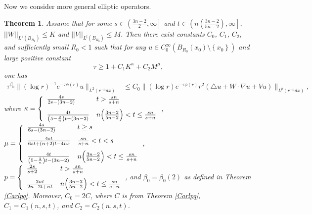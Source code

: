 \documentclass[11pt]{amsart}
\theoremstyle{plain}
\newtheorem{theorem}{Theorem}
\numberwithin{equation}{section}
\begin{document}
Now we consider more general elliptic operators.

\begin{theorem}
Assume that for some $s \in {\left( {\frac{3n-2}{2}, {\infty}} \right] }$ and $t \in {\left( { n{\left( {\frac{3n-2}{5n-2}} \right) }, {\infty}} \right] }$, ${\left\vert\left\vert {W}\right\vert\right\vert}_{L^s{\left( {B_{R_0}} \right) }} \le K$ and ${\left\vert\left\vert {V}\right\vert\right\vert}_{L^t{\left( {B_{R_0}} \right) }} \le M$.
Then there exist constants $C_0$, $C_1$, $C_2$, and sufficiently small $R_0 < 1$  such that for any $u\in C^{\infty}_{0}(B_{R_0}(x_0)\setminus {\left\{{x_0}\right\}})$ and large positive constant
$$\tau \ge 1+ C_1 K^{\kappa} + C_2 M^{\mu},$$
one has
\begin{align}
\tau^{{\beta}_0} \|(\log r)^{-1} e^{-\tau \phi(r)}u\|_{L^2(r^{-n}dx)}
&\leq  C_0 \|(\log r ) e^{-\tau \phi(r)} r^2{\left( { \triangle u + W \cdot {\nabla} u + V u} \right) }\|_{L^p(r^{-n} dx)} ,
\label{main1}
\end{align}
where
${\displaystyle} \kappa = \left\{\begin{array}{ll}
\frac{4s}{2s - {\left( {3n-2} \right) }} & t > \frac{sn}{s+n} \medskip \\
\frac{4t}{{\left( {5 - \frac 2 n} \right) }t - {\left( {3n-2} \right) }} & n{\left( {\frac{3n-2}{5n-2}} \right) }
< t \le \frac{sn}{s+n}
\end{array}\right.$,
${\displaystyle} \mu = \left\{\begin{array}{ll}
\frac{4s}{6s - {\left( {3n-2} \right) }} & t \ge s \medskip \\
\frac{4 s t}{6 s t + {\left( {n+2} \right) }t -4ns} & \frac{sn}{s+n} < t < s \medskip \\
\frac{4t}{{\left( {5 - \frac 2 n} \right) }t - {\left( {3n-2} \right) }} & n{\left( {\frac{3n-2}{5n-2}} \right) }
< t \le \frac{sn}{s+n}
\end{array}\right.$,
${\displaystyle} p = \left\{\begin{array}{ll}
\frac{2s}{s+2} & t > \frac{sn}{s+n} \medskip \\
\frac{2 n t }{2n - 2t + nt } & n{\left( {\frac{3n-2}{5n-2}} \right) } < t \le
\frac{sn}{s+n}
\end{array}\right.$,
and ${\beta}_0 = {\beta}_0{\left( {2} \right) }$ as defined in Theorem \ref{Carlpq}.
Moreover, $C_0 = 2C$, where $C$ is from Theorem \ref{Carlpq}, $C_1 = C_1{\left( {n, s, t} \right) }$, and $C_2 = C_2{\left( {n,s,t} \right) }$.
\label{CarlpqVW}
\end{theorem}
\end{document}
